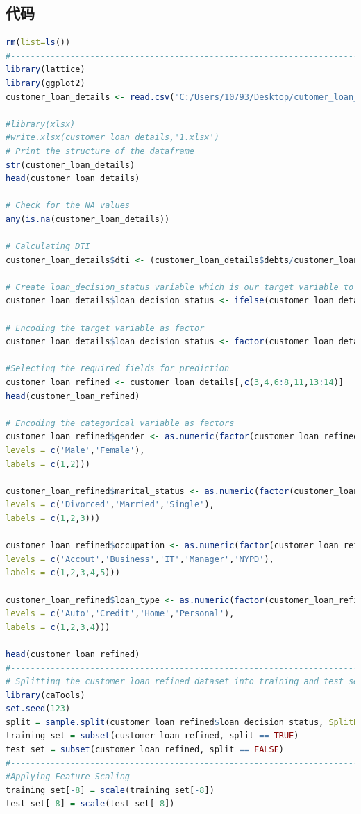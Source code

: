 \documentclass[UTF8]{ctexart}
\begin{document}
\newpage
\newpage
\clearpage
\begin{appendices}

\section{代码}
\begin{lstlisting}[language=R]
rm(list=ls())
#--------------------------------------------------------------------------
library(lattice)
library(ggplot2)
customer_loan_details <- read.csv("C:/Users/10793/Desktop/cutomer_loan_details.csv", sep = ",")

#library(xlsx)
#write.xlsx(customer_loan_details,'1.xlsx')
# Print the structure of the dataframe
str(customer_loan_details)
head(customer_loan_details)

# Check for the NA values
any(is.na(customer_loan_details))

# Calculating DTI
customer_loan_details$dti <- (customer_loan_details$debts/customer_loan_details$income)*100

# Create loan_decision_status variable which is our target variable to use for loan prediction
customer_loan_details$loan_decision_status <- ifelse(customer_loan_details$loan_decision_type == 'Denied', 0, 1)

# Encoding the target variable as factor
customer_loan_details$loan_decision_status <- factor(customer_loan_details$loan_decision_status, levels = c(0, 1))

#Selecting the required fields for prediction
customer_loan_refined <- customer_loan_details[,c(3,4,6:8,11,13:14)]
head(customer_loan_refined)

# Encoding the categorical variable as factors
customer_loan_refined$gender <- as.numeric(factor(customer_loan_refined$gender,
levels = c('Male','Female'),
labels = c(1,2)))

customer_loan_refined$marital_status <- as.numeric(factor(customer_loan_refined$marital_status,
levels = c('Divorced','Married','Single'),
labels = c(1,2,3)))

customer_loan_refined$occupation <- as.numeric(factor(customer_loan_refined$occupation,
levels = c('Accout','Business','IT','Manager','NYPD'),
labels = c(1,2,3,4,5)))

customer_loan_refined$loan_type <- as.numeric(factor(customer_loan_refined$loan_type,
levels = c('Auto','Credit','Home','Personal'),
labels = c(1,2,3,4)))

head(customer_loan_refined)
#--------------------------------------------------------------------------
# Splitting the customer_loan_refined dataset into training and test sets
library(caTools)
set.seed(123)
split = sample.split(customer_loan_refined$loan_decision_status, SplitRatio = 0.70)
training_set = subset(customer_loan_refined, split == TRUE)
test_set = subset(customer_loan_refined, split == FALSE)
#--------------------------------------------------------------------------
#Applying Feature Scaling
training_set[-8] = scale(training_set[-8])
test_set[-8] = scale(test_set[-8])


\end{lstlisting}
\end{appendices}
\end{document}
